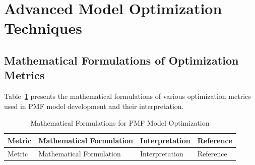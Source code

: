 \documentclass[
  letterpaper,
  oneside,
  openany]{MastersDoctoralThesis}
\begin{document}
\section{Advanced Model Optimization Techniques}\label{sec-ch2-advanced}

\subsection{Mathematical Formulations of Optimization
Metrics}\label{sec-ch2-math}

Table~\ref{tbl-ch2-optimization-metrics} presents the mathematical
formulations of various optimization metrics used in PMF model
development and their interpretation.

\begin{longtable}[]{@{}
  >{\raggedright\arraybackslash}p{}
  >{\raggedright\arraybackslash}p{}
  >{\raggedright\arraybackslash}p{}
  >{\raggedright\arraybackslash}p{}@{}}
\caption{Mathematical Formulations for PMF Model
Optimization}\label{tbl-ch2-optimization-metrics}\tabularnewline
\toprule\noalign{}
\begin{minipage}[b]{\linewidth}\raggedright
Metric
\end{minipage} & \begin{minipage}[b]{\linewidth}\raggedright
Mathematical Formulation
\end{minipage} & \begin{minipage}[b]{\linewidth}\raggedright
Interpretation
\end{minipage} & \begin{minipage}[b]{\linewidth}\raggedright
Reference
\end{minipage} \\
\midrule\noalign{}
\endfirsthead
\toprule\noalign{}
\begin{minipage}[b]{\linewidth}\raggedright
Metric
\end{minipage} & \begin{minipage}[b]{\linewidth}\raggedright
Mathematical Formulation
\end{minipage} & \begin{minipage}[b]{\linewidth}\raggedright
Interpretation
\end{minipage} & \begin{minipage}[b]{\linewidth}\raggedright
Reference
\end{minipage} \\

\end{longtable}
\end{document}

